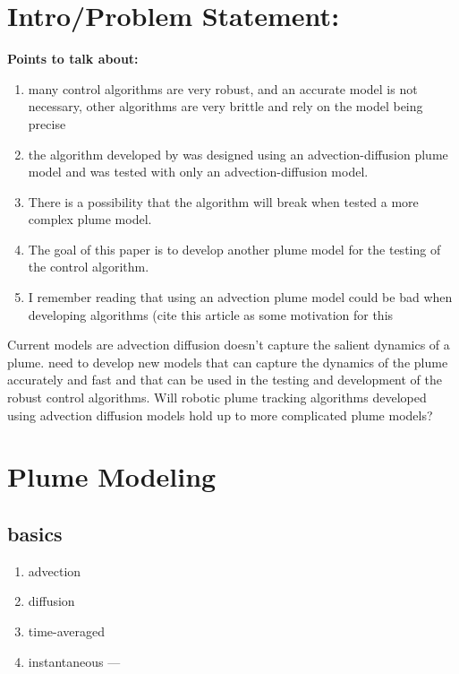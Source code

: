 \documentclass[11pt]{article} %
\begin{document}
\begin{enumerate}

\end{enumerate}

\section{Intro/Problem Statement:}

{\bf Points to talk about:}
\begin{enumerate}
\item many control algorithms are very robust, and an accurate model is not necessary, other algorithms are very brittle and rely on the model being precise
\item the algorithm developed by \cite{shuai2014} was designed using an advection-diffusion plume model and was tested with only an advection-diffusion model.  
\item There is a possibility that the algorithm will break when tested a more complex plume model.  
\item The goal of this paper is to develop another plume model for the testing of the control algorithm.
\item I remember reading that using an advection plume model could be bad when developing algorithms (cite this article as some motivation for this
\end{enumerate}


Current models are advection diffusion doesn't capture the salient dynamics of a plume.   need to develop new models that can capture the dynamics of the plume accurately and fast and that can be used in the testing and development of the robust control algorithms.   Will robotic plume tracking algorithms developed using advection diffusion models hold up to more complicated plume models?


\section{Plume Modeling}

\subsection{basics}
\begin{enumerate}
\item advection
\item diffusion
\item time-averaged
\item instantaneous  ---
	
\end{enumerate}
\end{document}
